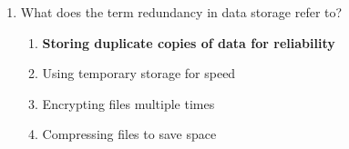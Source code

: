 \begin{enumerate}
    \item What does the term redundancy in data storage refer to?
    \begin{enumerate}
        \item \textbf{Storing duplicate copies of data for reliability}
        \item Using temporary storage for speed
        \item Encrypting files multiple times
        \item Compressing files to save space
    \end{enumerate}
\end{enumerate}

\newpage

